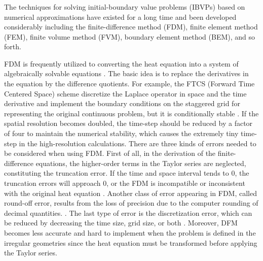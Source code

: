 \subsubsection{}\label{numerical methods}

The techniques for solving initial-boundary value problems (IBVPs)
based on numerical approximations have existed for a long time and
been developed considerably including the finite-difference method
(FDM), finite element method (FEM), finite volume method (FVM),
boundary element method (BEM), and so forth.


FDM is frequently utilized to converting the heat equation into a
system of algebraically solvable
equations \cite{grossmann2007numerical}. The basic idea is to replace
the derivatives in the equation by the difference quotients. For
example, the FTCS (Forward Time Centered Space)
scheme \cite{pletcher2012computational} discretize the Laplace
operator in space and the time derivative and implement the boundary
conditions on the staggered grid for representing the original
continuous problem, but it is conditionally
stable \cite{pletcher2012computational}. If the spatial resolution
becomes doubled, the time-step should be reduced by a factor of four
to maintain the numerical stability, which causes the extremely tiny
time-step in the high-resolution calculations. There are three kinds
of errors needed to be considered when using FDM. First of all, in the
derivation of the finite-difference equations, the higher-order terms
in the Taylor series are neglected, constituting the truncation
error. If the time and space interval tends to $0$, the truncation
errors will approach $0$, or the FDM is incompatible or inconsistent
with the original heat equation \cite{crank1979mathematics}. Another
class of error appearing in FDM, called round-off error, results from
the loss of precision due to the computer rounding of decimal
quantities. \cite{hoffman2018numerical}. The last type of error is the
discretization error, which can be reduced by decreasing the time
size, grid size, or both \cite{crank1979mathematics}. Moreover, DFM
becomes less accurate and hard to implement when the problem is
defined in the irregular geometries since the heat equation must be
transformed before applying the Taylor series.


